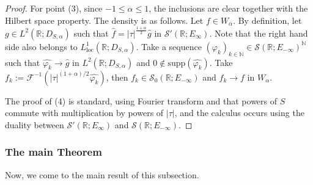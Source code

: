 \documentclass[11pt, letterpaper]{amsart}
\theoremstyle{definition}
\theoremstyle{remark}
\numberwithin{equation}{section}
\begin{document}
\begin{proof}
For point (3), since $-1\le \alpha\le 1$, the inclusions are clear together with the Hilbert space property. The density is as follows.  Let $f\in W_\alpha$.
By definition,  let $g \in L^2(\mathbb{R};D_{S,\alpha})$ such that $\hat{f}=\left| \tau \right|^{\frac{1+\alpha}{2}} \hat{g}$ in $\mathcal{S}'(\mathbb{R}; E_{\infty})$. Note that the right hand side also belongs to $L^1_{\mathrm{loc}}(\mathbb{R}; D_{S,\alpha})$. Take a sequence $(\varphi_k)_{k \in \mathbb{N}} \in \mathcal{S}(\mathbb{R}; E_{-\infty})^{\mathbb{N}}$ such that $\hat{\varphi_k } \to \hat{g}$ in $L^2(\mathbb{R};D_{S,\alpha})$ and $0 \notin \mathrm{supp}(\hat{\varphi_k}).$ Take $f_k:= \mathcal{F}^{-1}(\left| \tau \right|^{(1+\alpha) /2}\hat{\varphi_k})$, then $f_k \in \mathcal{S}_0(\mathbb{R}; E_{-\infty})$ and $f_k {\rightarrow} f$ in $W_\alpha$.

The proof of (4) is standard, using Fourier transform and that powers of $S$ commute with multiplication by powers of $|\tau|$, and the calculus occurs using the duality between $\mathcal{S'}(\mathbb{R};E_\infty)$ and $\mathcal{S}(\mathbb{R};E_{-\infty})$. \end{proof}


\subsubsection{The main Theorem}
Now, we come to the main result of this subsection.
\end{document}
